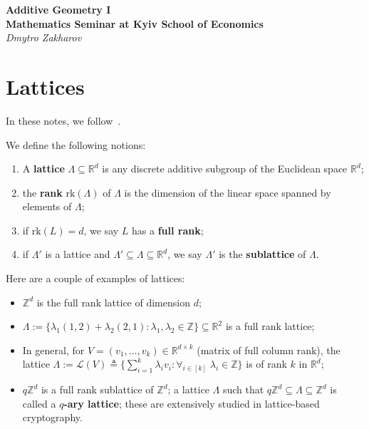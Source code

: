 \documentclass{template-2}
\begin{document}
\begin{center}
    \Large\textcolor{blue!70!black}{\textbf{Additive Geometry I}} \\
    \large \textbf{Mathematics Seminar at Kyiv School of Economics} \\
    \normalsize\textit{Dmytro Zakharov}
\end{center}


\section{Lattices}\label{section:lattices}

In these notes, we follow~\cite{TaoVu06}.

\begin{definition}
    We define the following notions:
    \begin{enumerate}
        \item[(i)] A \textbf{lattice} $\Lambda \subseteq \mathbb{R}^d$ is any discrete
    additive subgroup of the Euclidean space $\mathbb{R}^d$;
        \item[(ii)] the \textbf{rank} $\text{rk}(\Lambda)$ of $\Lambda$ is the dimension of
    the linear space spanned by elements of $\Lambda$;
        \item[(iii)] if $\text{rk}(L)=d$, we say $L$ has a \textbf{full rank};
        \item[(iv)] if $\Lambda'$ is a lattice and $\Lambda' \subseteq \Lambda \subseteq \mathbb{R}^d$,
        we say $\Lambda'$ is the \textbf{sublattice} of $\Lambda$.
    \end{enumerate}
\end{definition}

\begin{example}
    Here are a couple of examples of lattices:
    \begin{itemize}
        \item[(i)] $\mathbb{Z}^d$ is the full rank lattice of dimension $d$;
        \item[(ii)] $\Lambda := \{\lambda_1(1,2) + \lambda_2(2,1): \lambda_1,
        \lambda_2 \in \mathbb{Z}\} \subseteq \mathbb{R}^2$ is a full rank
        lattice;
        \item[(iii)] In general, for $V = (v_1,\dots,v_k) \in
        \mathbb{R}^{d \times k}$ (matrix of full column rank), the lattice $\Lambda :=
        \mathcal{L}(V) \triangleq \{\sum_{i=1}^k \lambda_iv_i: \forall_{i
        \in [k]} \; \lambda_i \in \mathbb{Z}\}$ is of rank $k$ in $\mathbb{R}^d$;
        \item[(iv)] $q\mathbb{Z}^d$ is a full rank sublattice of $\mathbb{Z}^d$;
        a lattice $\Lambda$ such that $q\mathbb{Z}^d \subseteq \Lambda \subseteq
        \mathbb{Z}^d$ is called a \textbf{$q$-ary lattice}; these are extensively 
        studied in lattice-based cryptography.
    \end{itemize}
\end{example}
\end{document}
